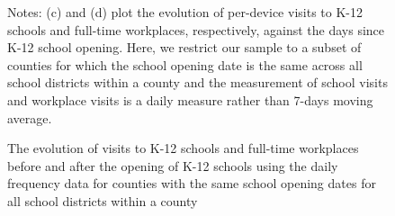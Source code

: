 \documentclass[9pt,twoside,lineno]{pnas-new}
\theoremstyle{definition}
\begin{document}
\begin{figure}[ht]
  \caption{The evolution of  visits to K-12 schools and full-time workplaces before and after the opening of K-12 schools using the daily frequency data for counties with the same school opening dates for all school districts within a county\label{fig:case-growth-day}}\smallskip
{}
\vspace{-0.2cm}  {\scriptsize
\begin{flushleft}
Notes:   (c) and (d) plot the evolution of per-device visits to K-12 schools and full-time workplaces, respectively, against the days since K-12 school opening.  Here, we restrict our sample to a subset of counties for which the school opening date is the same across all school districts within a county and the measurement of school visits and workplace visits is a daily measure rather than 7-days moving average.

\end{flushleft}}
\end{figure}
\end{document}
